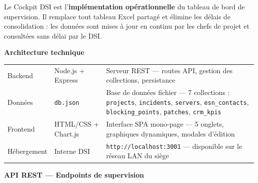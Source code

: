 \documentclass[11pt,a4paper,oneside]{report}
\begin{document}
\begin{finding}
Le Cockpit DSI est l'\textbf{implémentation opérationnelle} du tableau de bord de supervision. Il remplace tout tableau Excel partagé et élimine les délais de consolidation : les données sont mises à jour en continu par les chefs de projet et consultées sans délai par le DSI.
\end{finding}

\textbf{Architecture technique}

\vspace{4pt}
\begin{center}
\renewcommand{\arraystretch}{1.5}
\begin{tabularx}{\textwidth}{L{3cm} L{3.5cm} L{7.5cm}}
\toprule
{}
 &  &  \\
\midrule
Backend & Node.js + Express & Serveur REST — routes API, gestion des collections, persistance \\
Données & \texttt{db.json} & Base de données fichier — 7 collections : \texttt{projects}, \texttt{incidents}, \texttt{servers}, \texttt{esn\_contacts}, \texttt{blocking\_points}, \texttt{patches}, \texttt{crm\_kpis} \\
Frontend & HTML/CSS + Chart.js & Interface SPA mono-page — 5 onglets, graphiques dynamiques, modales d'édition \\
Hébergement & Interne DSI & \texttt{http://localhost:3001} — disponible sur le réseau LAN du siège \\
\bottomrule
\end{tabularx}
\end{center}

\textbf{API REST — Endpoints de supervision}
\end{document}
